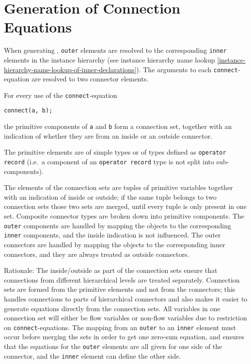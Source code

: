 \section{Generation of Connection Equations}\label{generation-of-connection-equations}

When generating , \lstinline!outer! elements are resolved to the corresponding \lstinline!inner! elements in the instance hierarchy (see instance hierarchy name lookup \cref{instance-hierarchy-name-lookup-of-inner-declarations}).
The arguments to each \lstinline!connect!-equation are resolved to two connector elements.

For every use of the \lstinline!connect!-equation
\begin{lstlisting}[language=modelica]
connect(a, b);
\end{lstlisting}
the primitive components of \lstinline!a! and \lstinline!b! form a connection set, together with an indication of whether they are from an inside or an outside connector.
\begin{definition}\label{primitive-elements}
The primitive elements are of simple types or of types defined as \lstinline!operator record! (i.e.\ a component of an \lstinline!operator record! type is not split into sub-components).
\end{definition}
The elements of the connection sets are tuples of primitive variables together with an indication of inside or outside; if the same tuple belongs to two connection sets those two sets are merged, until every tuple is only present in one set.
Composite connector types are broken down into primitive components.
The \lstinline!outer! components are handled by mapping the objects to the corresponding \lstinline!inner! components, and the inside indication is not influenced.
The outer connectors are handled by mapping the objects to the corresponding inner connectors, and they are always treated as outside connectors.

\begin{nonnormative}
Rationale: The inside/outside as part of the connection sets ensure that connections from different hierarchical levels are treated separately.
Connection sets are formed from the primitive elements and not from the connectors; this handles connections to parts of hierarchical connectors and also makes it easier to generate equations directly from the connection sets.
All variables in one connection set will either be flow variables or non-flow variables due to restriction on \lstinline!connect!-equations.
The mapping from an \lstinline!outer! to an \lstinline!inner! element must occur before merging the sets in order to get one zero-sum equation, and ensures that the equations for the \lstinline!outer! elements are all given for one side of the connector, and the \lstinline!inner! element can define the other side.
\end{nonnormative}

